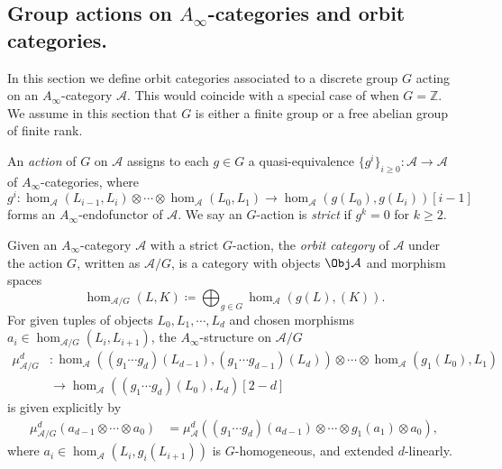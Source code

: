 \subsection{Group actions on $A_{\infty}$-categories and orbit categories.} In this section we define orbit categories associated to a discrete group $G$ acting on an $A_{\infty}$-category $\mathcal{A}$. This would coincide with a special case of \cite{FKQ24} when $G=\mathbb{Z}$. We assume in this section that $G$ is either a finite group or a free abelian group of finite rank.
\begin{dfn}
    An \emph{action} of $G$ on $\mathcal{A}$ assigns to each $g\in G$ a quasi-equivalence $\{g^i\}_{i\geq 0}\colon\mathcal{A}\to\mathcal{A}$ of $A_{\infty}$-categories, where \[
    g^i\colon\hom_{\mathcal{A}} (L_{i-1}, L_i)\otimes\dotsb\otimes\hom_{\mathcal{A}} (L_0, L_1)\to\hom_{\mathcal{A}} (g(L_0),g(L_i))[i-1]
    \]forms an $A_{\infty}$-endofunctor of $\mathcal{A}$. We say an $G$-action is \emph{strict} if $g^k =0$ for $k\geq 2$.
\end{dfn}
\begin{dfn}\label{defn:Ainf-orbit-category}
    Given an $A_{\infty}$-category $\mathcal{A}$ with a strict $G$-action, the \emph{orbit category} of $\mathcal{A}$ under the action $G$, written as $\mathcal{A}/G$, is a category with objects $\Obj\mathcal{A}$ and morphism spaces\[
    \hom_{\mathcal{A}/G} (L,K)\coloneqq\bigoplus_{g\in G}\hom_{\mathcal{A}} (g(L),(K)).
    \]
    For given tuples of objects $L_0, L_1,\dotsb ,L_d$ and chosen morphisms $a_i\in\hom_{\mathcal{A}/G} (L_i, L_{i+1})$, the $A_{\infty}$-structure on $\mathcal{A}/G$ \begin{align*}
    \mu_{\mathcal{A}/G}^d &\colon\hom_{\mathcal{A}} ((g_1\dotsb g_d)(L_{d-1}),(g_1\dotsb g_{d-1})(L_d))\otimes\dotsb\otimes\hom_{\mathcal{A}} (g_1 (L_0),L_1)\\ 
    &\to\hom_{\mathcal{A}} ((g_1\dotsb g_d)(L_0),L_d)[2-d]
    \end{align*}
    is given explicitly by 
    \begin{align*}
        \mu_{\mathcal{A}/G}^d (a_{d-1}\otimes\dotsb\otimes a_0)&=\mu_{\mathcal{A}}^d ((g_1\dotsb g_d) (a_{d-1})\otimes\dotsb\otimes g_1 (a_1)\otimes a_0),
    \end{align*}
    where $a_i\in\hom_{\mathcal{A}} (L_i,g_i (L_{i+1}))$ is $G$-homogeneous, and extended $d$-linearly.
\end{dfn}
